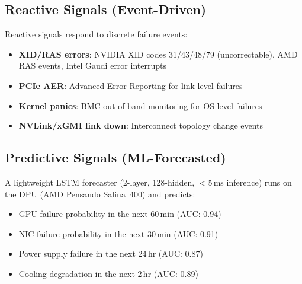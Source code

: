 \documentclass[conference,10pt,letterpaper]{IEEEtran}
\begin{document}
\subsection{Reactive Signals (Event-Driven)}

Reactive signals respond to discrete failure events:
\begin{itemize}
\item \textbf{XID/RAS errors}: NVIDIA XID codes 31/43/48/79 (uncorrectable), AMD RAS events, Intel Gaudi error interrupts
\item \textbf{PCIe AER}: Advanced Error Reporting for link-level failures
\item \textbf{Kernel panics}: BMC out-of-band monitoring for OS-level failures
\item \textbf{NVLink/xGMI link down}: Interconnect topology change events
\end{itemize}

\subsection{Predictive Signals (ML-Forecasted)}

A lightweight LSTM forecaster (2-layer, 128-hidden, $<$5\,ms inference) runs on the DPU (AMD Pensando Salina~400) and predicts:
\begin{itemize}
\item GPU failure probability in the next 60\,min (AUC: 0.94)
\item NIC failure probability in the next 30\,min (AUC: 0.91)
\item Power supply failure in the next 24\,hr (AUC: 0.87)
\item Cooling degradation in the next 2\,hr (AUC: 0.89)
\end{itemize}

\begin{table}[!t]
\caption{Signal Architecture Summary}
\label{tab:signals}
\centering\scriptsize
{}
\end{table}
\end{document}

